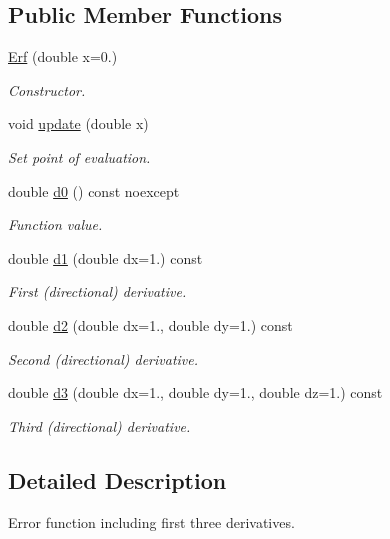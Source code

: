 \subsection*{Public Member Functions}
\begin{DoxyCompactItemize}
\item 
\hyperlink{structFunG_1_1Erf_a98e6b3c8281468c2e548862b1b6cb3b2}{Erf} (double x=0.)
\begin{DoxyCompactList}\small\item\em Constructor. \end{DoxyCompactList}\item 
void \hyperlink{structFunG_1_1Erf_ab81e682d208e5cbdac13a38f41009719}{update} (double x)
\begin{DoxyCompactList}\small\item\em Set point of evaluation. \end{DoxyCompactList}\item 
double \hyperlink{structFunG_1_1Erf_a4324497e38e92b7c04aaf1943cea7d5b}{d0} () const noexcept
\begin{DoxyCompactList}\small\item\em Function value. \end{DoxyCompactList}\item 
double \hyperlink{structFunG_1_1Erf_a1af39deb75c6a7d02184466e818609fd}{d1} (double dx=1.) const 
\begin{DoxyCompactList}\small\item\em First (directional) derivative. \end{DoxyCompactList}\item 
double \hyperlink{structFunG_1_1Erf_aad68ee9f40ed53655f498022233fd48f}{d2} (double dx=1., double dy=1.) const 
\begin{DoxyCompactList}\small\item\em Second (directional) derivative. \end{DoxyCompactList}\item 
double \hyperlink{structFunG_1_1Erf_aaf1ef5bf750b5b48d8d8c0f51820041a}{d3} (double dx=1., double dy=1., double dz=1.) const 
\begin{DoxyCompactList}\small\item\em Third (directional) derivative. \end{DoxyCompactList}\end{DoxyCompactItemize}


\subsection{Detailed Description}
Error function including first three derivatives. 

